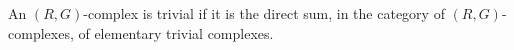 An $(R, G)$-complex is trivial if it is the direct sum, in the category of $(R, G)$-complexes, of elementary trivial complexes.
